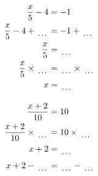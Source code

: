 \documentclass[12pt]{article}
\newcounter{minipagecount}
\begin{document}
\begin{multicols}{2}
\begin{minipage}[t]{0.45\textwidth}
    \raggedright %
    \begin{align*} %
        \frac{x}{5} - 4 &= -1\\
        \frac{x}{5} - 4 + \dotuline{\hspace{5mm}} &= -1 + \dotuline{\hspace{5mm}}\\
        \frac{x}{5} &= \dotuline{\hspace{5mm}}\\
        \frac{x}{5} \times\dotuline{\hspace{5mm}} &= \dotuline{\hspace{5mm}} \times\dotuline{\hspace{5mm}}\\
        x &= \dotuline{\hspace{5mm}}\\
    \end{align*}
\end{minipage}\columnbreak
\noindent{(\theminipagecount)}\hspace{0.1mm} %
\begin{minipage}[t]{0.45\textwidth} %
    \vspace{-26pt}  %
    \raggedright %
    \begin{align*} %
        \frac{x + 2}{10} &= 10\\
        \frac{x + 2}{10} \times\dotuline{\hspace{5mm}} &= 10 \times\dotuline{\hspace{5mm}}\\
        x + 2 &= \dotuline{\hspace{5mm}}\\
        x + 2 - \dotuline{\hspace{5mm}} &= \dotuline{\hspace{5mm}} - \dotuline{\hspace{5mm}}\\

\end{align*}
\end{minipage}
\end{multicols}
\end{document}
